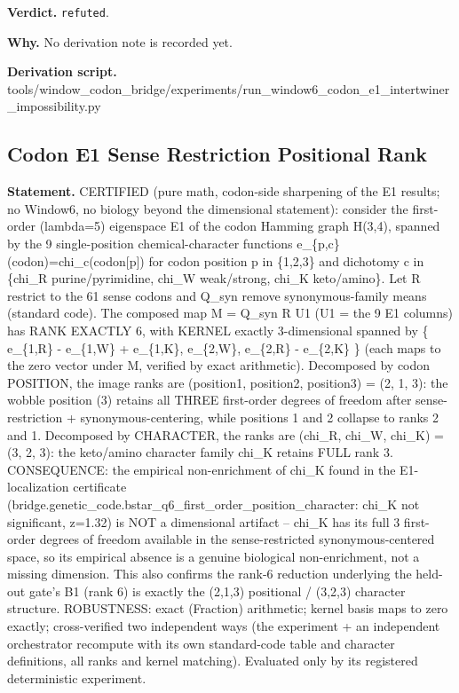 \textbf{Verdict.} \texttt{refuted}.

\textbf{Why.} No derivation note is recorded yet.

\textbf{Derivation script.} tools/window\_codon\_bridge/experiments/run\_window6\_codon\_e1\_intertwiner\_impossibility.py

\subsection{Codon E1 Sense Restriction Positional Rank}\label{sec:bridge-codon-e1-sense-restriction-positional-rank}
\textbf{Statement.} CERTIFIED (pure math, codon-side sharpening of the E1 results; no Window6, no biology beyond the
dimensional statement): consider the first-order (lambda=5) eigenspace E1 of the codon Hamming graph
H(3,4), spanned by the 9 single-position chemical-character functions
e\_\{p,c\}(codon)=chi\_c(codon[p]) for codon position p in \{1,2,3\} and dichotomy c in \{chi\_R
purine/pyrimidine, chi\_W weak/strong, chi\_K keto/amino\}. Let R restrict to the 61 sense codons
and Q\_syn remove synonymous-family means (standard code). The composed map M = Q\_syn R U1 (U1 =
the 9 E1 columns) has RANK EXACTLY 6, with KERNEL exactly 3-dimensional spanned by \{ e\_\{1,R\} -
e\_\{1,W\} + e\_\{1,K\}, e\_\{2,W\}, e\_\{2,R\} - e\_\{2,K\} \} (each maps to the zero vector under
M, verified by exact arithmetic). Decomposed by codon POSITION, the image ranks are (position1,
position2, position3) = (2, 1, 3): the wobble position (3) retains all THREE first-order degrees of
freedom after sense-restriction + synonymous-centering, while positions 1 and 2 collapse to ranks 2
and 1. Decomposed by CHARACTER, the ranks are (chi\_R, chi\_W, chi\_K) = (3, 2, 3): the keto/amino
character family chi\_K retains FULL rank 3. CONSEQUENCE: the empirical non-enrichment of chi\_K
found in the E1-localization certificate
(bridge.genetic\_code.bstar\_q6\_first\_order\_position\_character: chi\_K not significant, z=1.32)
is NOT a dimensional artifact -- chi\_K has its full 3 first-order degrees of freedom available in
the sense-restricted synonymous-centered space, so its empirical absence is a genuine biological
non-enrichment, not a missing dimension. This also confirms the rank-6 reduction underlying the
held-out gate's B1 (rank 6) is exactly the (2,1,3) positional / (3,2,3) character structure.
ROBUSTNESS: exact (Fraction) arithmetic; kernel basis maps to zero exactly; cross-verified two
independent ways (the experiment + an independent orchestrator recompute with its own standard-code
table and character definitions, all ranks and kernel matching). Evaluated only by its registered
deterministic experiment.

